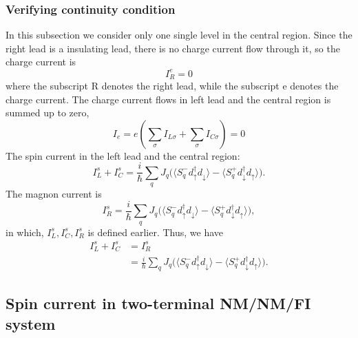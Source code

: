 \documentclass[aps,prb,superscriptaddress]{revtex4-2}
\begin{document}
\subsubsection{Verifying continuity condition}
In this subsection we consider only one single level in the central region. Since the right lead is a insulating lead, there is no charge current flow through it, so the charge current is
\begin{equation}
I_R^e = 0
\end{equation}
where the subscript R denotes the right lead, while the subscript e denotes the charge current. The charge current flows in left lead and the central region is summed up to zero,
\begin{equation}
I_{e} = e(\sum_{\sigma}I_{L\sigma} + \sum_{\sigma}I_{C\sigma}) = 0
\end{equation}
The spin current in the left lead and the central region:
\begin{equation}
I_L^s + I_C^s = \frac{i}{\hbar} \sum_{q} J_{q} \big( \big\langle S_{q}^{-}d_{\uparrow}^{\dag}d_{\downarrow}\big\rangle - \big\langle S_{q}^{+}d_{\downarrow}^{\dag}d_{\uparrow} \big\rangle \big) .
\end{equation}
The magnon current is
\begin{equation}
I_R^s = \frac{i}{\hbar} \sum_{q} J_{q} \big( \big\langle S_{q}^{-}d_{\uparrow}^{\dag}d_{\downarrow}\big\rangle - \big\langle S_{q}^{+}d_{\downarrow}^{\dag}d_{\uparrow} \big\rangle \big) ,
\end{equation}
in which, $I_L^s, I_C^s, I_R^s$ is defined earlier. Thus, we have
\begin{equation}
\begin{split}
I_L^s + I_C^s &= I_R^s\\
& = \frac{i}{\hbar} \sum_{q} J_{q} \big( \big\langle S_{q}^{-}d_{\uparrow}^{\dag}d_{\downarrow}\big\rangle - \big\langle S_{q}^{+}d_{\downarrow}^{\dag}d_{\uparrow} \big\rangle \big) .
\end{split}
\end{equation}

\subsection{Spin current in two-terminal NM/NM/FI system}
\end{document}
